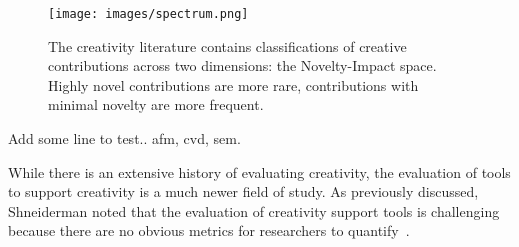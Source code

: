 \begin{figure}[t]
\centering
\texttt{[image: images/spectrum.png]}
\caption{The creativity literature contains classifications of creative contributions across two dimensions: the Novelty-Impact space. Highly novel contributions are more rare, contributions with minimal novelty are more frequent.}
\end{figure}

Add some line to test.\cite{Pusey2011}. \gls{afm}, \gls{cvd}, \gls{sem}.

\label{CSTEvaluation}
While there is an extensive history of evaluating creativity, the evaluation of tools to support creativity is a much newer field of study. As previously discussed, Shneiderman noted that the evaluation of creativity support tools is challenging because there are no obvious metrics for researchers to quantify~\cite{Shneiderman:2007wp}. 
